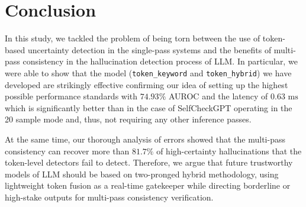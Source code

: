 \documentclass[conference]{IEEEtran}
\begin{document}
\section{Conclusion}
In this study, we tackled the problem of being torn between the use of token-based uncertainty detection in the single-pass systems and the benefits of multi-pass consistency in the hallucination detection process of LLM. In particular, we were able to show that the model (\texttt{token\_keyword} and \texttt{token\_hybrid}) we have developed are strikingly effective confirming our idea of setting up the highest possible performance standards with $74.93\%$ AUROC and the latency of $0.63\text{ ms}$ which is significantly better than in the case of SelfCheckGPT operating in the 20 sample mode and, thus, not requiring any other inference passes. 

At the same time, our thorough analysis of errors showed that the multi-pass consistency can recover more than $81.7\%$ of high-certainty hallucinations that the token-level detectors fail to detect. Therefore, we argue that future trustworthy models of LLM should be based on two-pronged hybrid methodology, using lightweight token fusion as a real-time gatekeeper while directing borderline or high-stake outputs for multi-pass consistency verification.



\end{document}
